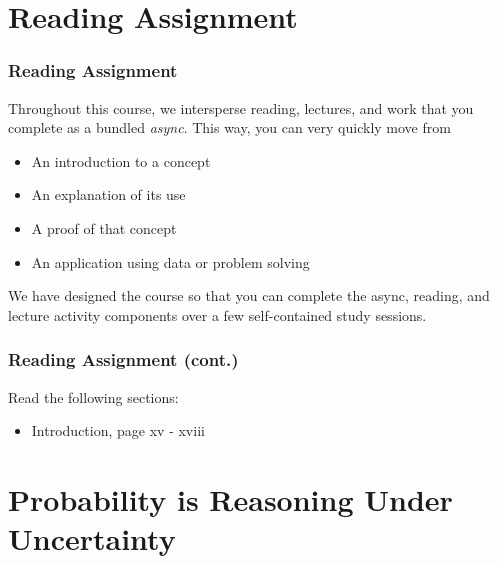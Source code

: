 \documentclass[12pt, block=fill]{beamer}
\begin{document}


%


\section{Reading Assignment}

\begin{frame}
  \frametitle{Reading Assignment}
  Throughout this course, we intersperse reading, lectures, and work
  that you complete as a bundled \textit{async}. This way, you can
  very quickly move from 
  \begin{itemize}
  \item An introduction to a concept
  \item An explanation of its use
  \item A proof of that concept 
  \item An application using data or problem solving
  \end{itemize}
  We have designed the course so that you can complete the async,
  reading, and lecture activity components over a few self-contained
  study sessions.
\end{frame}

\begin{frame}
  \frametitle{Reading Assignment (cont.)}
  Read the following sections:

  \begin{itemize}
  \item Introduction, page xv - xviii
  \end{itemize}
\end{frame}

\section{Probability is Reasoning Under Uncertainty}
\end{document}
